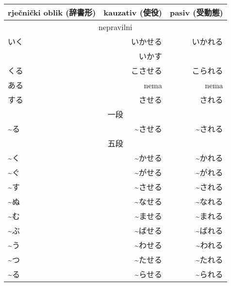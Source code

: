 	\begin{table}[h]
		\centering
		\begin{tabular}{l r r}\toprule[2pt]
			rječnički oblik (辞書形) & kauzativ (使役) & pasiv (受動態)\\
			\midrule
			\multicolumn{3}{c}{nepravilni}\\
			\midrule
			いく & いかせる & いかれる\\
			& いかす & \\
			くる & こさせる & こられる\\
			ある & nema\footnotemark[1] & nema\footnotemark[1]\\
			する & させる & される\\
			\midrule
			\multicolumn{3}{c}{一段}\\
			\midrule
			\textasciitilde る & \textasciitilde させる & \textasciitilde される\footnotemark[2]\\
			\midrule
			\multicolumn{3}{c}{五段}\\
			\midrule
			\textasciitilde く & \textasciitilde かせる & \textasciitilde かれる\\
			\textasciitilde ぐ & \textasciitilde がせる & \textasciitilde がれる\\\vspace{5pt}
			\textasciitilde す & \textasciitilde させる & \textasciitilde される\\
			\textasciitilde ぬ & \textasciitilde なせる & \textasciitilde なれる\\
			\textasciitilde む & \textasciitilde ませる & \textasciitilde まれる\\\vspace{5pt}
			\textasciitilde ぶ & \textasciitilde ばせる & \textasciitilde ばれる\\
			\textasciitilde う & \textasciitilde わせる & \textasciitilde われる\\
			\textasciitilde つ & \textasciitilde たせる & \textasciitilde たれる\\
			\textasciitilde る & \textasciitilde らせる & \textasciitilde られる\\
			\bottomrule[2pt]
		\end{tabular}
	\end{table}
	
